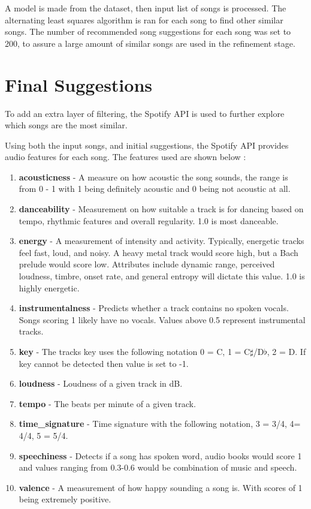 A model is made from the dataset, then input list of songs is processed. The alternating least squares algorithm is ran for each song to find other similar songs. The number of recommended song suggestions for each song was set to 200, to assure a large amount of similar songs are used in the refinement stage.


\section{Final Suggestions}
To add an extra layer of filtering, the Spotify API is used to further explore which songs are the most similar.

Using both the input songs, and initial suggestions, the Spotify API provides audio features for each song. The features used are shown below \citep{spotify_web_2023}:

\begin{enumerate}
	\item \textbf{acousticness} - A measure on how acoustic the song sounds, the range is from 0 - 1 with 1 being definitely acoustic and 0 being not acoustic at all.
	\item \textbf{danceability} - Measurement on how suitable a track is for dancing based on tempo, rhythmic features and overall regularity. 1.0 is most danceable. 
	\item \textbf{energy} - A measurement of intensity and activity. Typically, energetic tracks feel fast, loud, and noisy. A heavy metal track would score high, but a Bach prelude would score low. Attributes include dynamic range, perceived loudness, timbre, onset rate, and general entropy will dictate this value. 1.0 is highly energetic.
	\item \textbf{instrumentalness} - Predicts whether a track contains no spoken vocals. Songs scoring 1 likely have no vocals. Values above 0.5 represent instrumental tracks.
	\item \textbf{key} - The tracks key uses the following notation 0 = C, 1 = C$\sharp$/D$\flat$, 2 = D. If key cannot be detected then value is set to -1.
	\item \textbf{loudness} - Loudness of a given track in dB.
	\item \textbf{tempo} - The beats per minute of a given track.
	\item \textbf{time\_signature} - Time signature with the following notation, 3 = 3/4, 4= 4/4, 5 = 5/4.
	\item \textbf{speechiness} - Detects if a song has spoken word, audio books would score 1 and values ranging from 0.3-0.6 would be combination of music and speech.
	\item \textbf{valence} - A measurement of how happy sounding a song is. With scores of 1 being extremely positive.
	
\end{enumerate}


